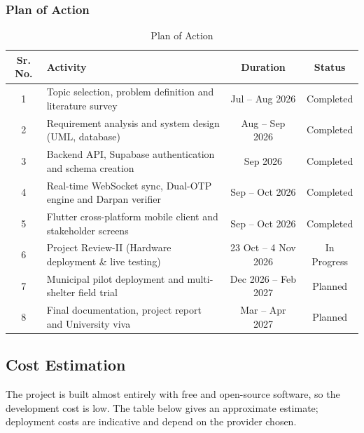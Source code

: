 \documentclass[12pt,a4paper]{article}
\begin{document}
\subsubsection{Plan of Action}
\begin{table}[H]
\centering
\caption{Plan of Action}
\label{tab:plan_of_action}
\begin{tabularx}{\textwidth}{|c|X|c|c|}
    \hline
    \textbf{Sr. No.} & \textbf{Activity} & \textbf{Duration} & \textbf{Status} \\
    \hline
    1 & Topic selection, problem definition and literature survey & Jul – Aug 2026 & Completed \\
    \hline
    2 & Requirement analysis and system design (UML, database) & Aug – Sep 2026 & Completed \\
    \hline
    3 & Backend API, Supabase authentication and schema creation & Sep 2026 & Completed \\
    \hline
    4 & Real-time WebSocket sync, Dual-OTP engine and Darpan verifier & Sep – Oct 2026 & Completed \\
    \hline
    5 & Flutter cross-platform mobile client and stakeholder screens & Sep – Oct 2026 & Completed \\
    \hline
    6 & Project Review-II (Hardware deployment \& live testing) & 23 Oct – 4 Nov 2026 & In Progress \\
    \hline
    7 & Municipal pilot deployment and multi-shelter field trial & Dec 2026 – Feb 2027 & Planned \\
    \hline
    8 & Final documentation, project report and University viva & Mar – Apr 2027 & Planned \\
    \hline
\end{tabularx}
\end{table}

\subsection{Cost Estimation}
The project is built almost entirely with free and open-source software, so the development cost is low. The table below gives an approximate estimate; deployment costs are indicative and depend on the provider chosen.
\end{document}
